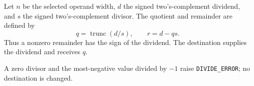 Let \(n\) be the selected operand width, \(d\) the signed two's-complement dividend, and \(s\) the signed two's-complement divisor. The quotient and remainder are defined by
\[
  q = \operatorname{trunc}(d/s),
  \qquad r = d - qs .
\]
Thus a nonzero remainder has the sign of the dividend. The destination supplies the dividend and receives \(q\).

A zero divisor and the most-negative value divided by \(-1\) raise \texttt{DIVIDE\_ERROR}; no destination is changed.
